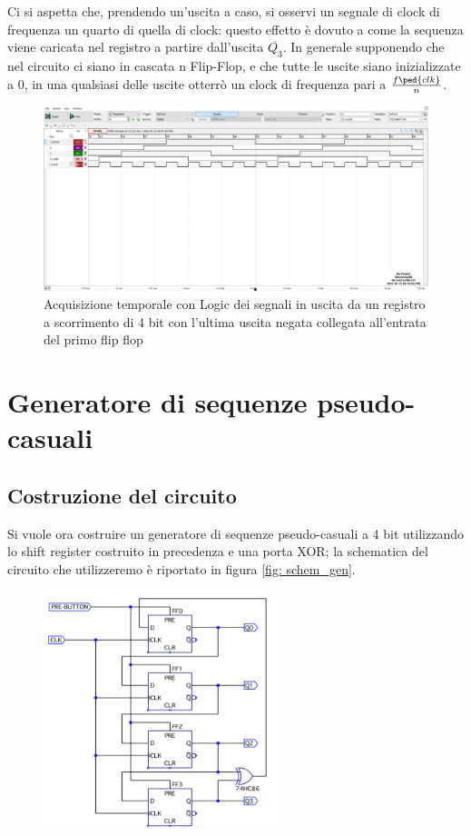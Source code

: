 \documentclass[10pt, a4paper, italian]{article}
\begin{document}
Ci si aspetta che, prendendo un'uscita a caso, si osservi un segnale di clock di frequenza un quarto di quella di clock: questo effetto è dovuto a come la sequenza viene caricata nel registro a partire dall'uscita $\overline{Q_3}$.
In generale supponendo che nel circuito ci siano in cascata n Flip-Flop, e che tutte le uscite siano inizializzate a 0, in una qualsiasi delle uscite otterrò un clock di frequenza pari a $\frac{f\ped{clk}}{n}$.
\begin{figure}[htbp]
\centering
	\includegraphics[width=\textwidth]{3.e}
	\caption{Acquisizione temporale con Logic dei segnali in uscita da un registro a scorrimento di 4 bit con l'ultima uscita negata collegata all'entrata del primo flip flop
	\label{fig: Shift_reg_seq}}
\end{figure}

\section{Generatore di sequenze pseudo-casuali}
\subsection{Costruzione del circuito}
Si vuole ora costruire un generatore di sequenze pseudo-casuali a 4 bit utilizzando lo shift register costruito in precedenza e una porta XOR; la schematica del circuito che utilizzeremo è riportato in figura \cref{fig: schem_gen}.
\begin{figure}[htbp]
\centering
	\includegraphics[width=0.6\textwidth]{schem_gen}
\end{figure}
\end{document}
